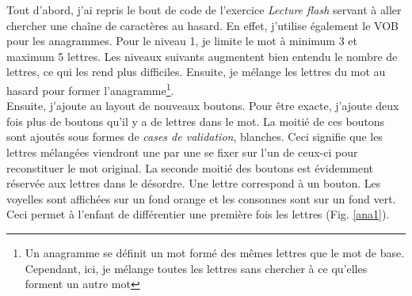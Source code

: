 Tout d'abord, j'ai repris le bout de code de l'exercice \textit{Lecture flash} servant à aller chercher une chaîne de caractères au hasard. En effet, j'utilise également le VOB pour les anagrammes. Pour le niveau 1, je limite le mot à minimum 3 et maximum 5 lettres. Les niveaux suivants augmentent bien entendu le nombre de lettres, ce qui les rend plus difficiles. Ensuite, je mélange les lettres du mot au hasard pour former l'anagramme\footnote{Un anagramme se définit un mot formé des mêmes lettres que le mot de base. Cependant, ici, je mélange toutes les lettres sans chercher à ce qu'elles forment un autre mot}.\\

Ensuite, j'ajoute au layout de nouveaux boutons. Pour être exacte, j'ajoute deux fois plus de boutons qu'il y a de lettres dans le mot. La moitié de ces boutons sont ajoutés sous formes de \textit{cases de validation}, blanches. Ceci signifie que les lettres mélangées viendront une par une se fixer sur l'un de ceux-ci pour reconstituer le mot original. La seconde moitié des boutons est évidemment réservée aux lettres dans le désordre. Une lettre correspond à un bouton. Les voyelles sont affichées sur un fond orange et les consonnes sont sur un fond vert. Ceci permet à l'enfant de différentier une première fois les lettres (Fig. \ref{ana1}).\\

